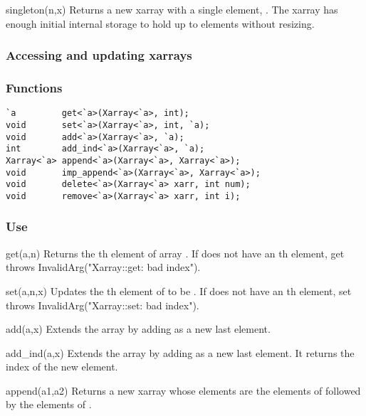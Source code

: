\begin{defun}{singleton}{(n,x)}
Returns a new xarray with a single element, .  The xarray has
enough initial internal storage to hold up to  elements without
resizing.
\end{defun}

\subsubsection*{Accessing and updating xarrays}
\subsubsection*{Functions}
\begin{verbatim}
`a         get<`a>(Xarray<`a>, int);
void       set<`a>(Xarray<`a>, int, `a);
void       add<`a>(Xarray<`a>, `a);
int        add_ind<`a>(Xarray<`a>, `a);
Xarray<`a> append<`a>(Xarray<`a>, Xarray<`a>);
void       imp_append<`a>(Xarray<`a>, Xarray<`a>);
void       delete<`a>(Xarray<`a> xarr, int num);
void       remove<`a>(Xarray<`a> xarr, int i);
\end{verbatim}

\subsubsection*{Use}

\begin{defun}{get}{(a,n)}
Returns the th element of array .  If  does not
have an th element, get throws InvalidArg("Xarray::get: bad
index").
\end{defun}

\begin{defun}{set}{(a,n,x)}
Updates the th element of  to be .  If  does
not have an th element, set throws InvalidArg("Xarray::set: bad
index").
\end{defun}

\begin{defun}{add}{(a,x)}
Extends the array  by adding  as a new last element.
\end{defun}

\begin{defun}{add_ind}{(a,x)}
Extends the array  by adding  as a new last element.  It
returns the index of the new element.
\end{defun}

\begin{defun}{append}{(a1,a2)}
Returns a new xarray whose elements are the elements of 
followed by the elements of .
\end{defun}

